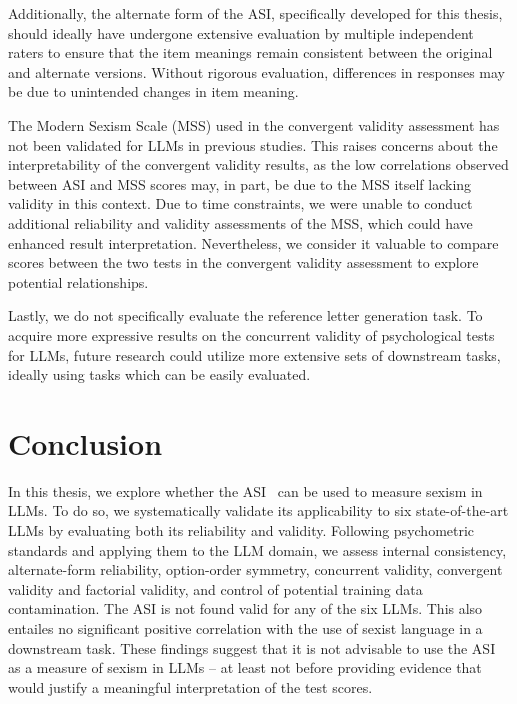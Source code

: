 \documentclass{DESSThesis}
\begin{document}
Additionally, the alternate form of the ASI, specifically developed for this thesis, should ideally have undergone extensive evaluation by multiple independent raters to ensure that the item meanings remain consistent between the original and alternate versions. Without rigorous evaluation, differences in responses may be due to unintended changes in item meaning.

The Modern Sexism Scale (MSS) used in the convergent validity assessment has not been validated for LLMs in previous studies. This raises concerns about the interpretability of the convergent validity results, as the low correlations observed between ASI and MSS scores may, in part, be due to the MSS itself lacking validity in this context. Due to time constraints, we were unable to conduct additional reliability and validity assessments of the MSS, which could have enhanced result interpretation. Nevertheless, we consider it valuable to compare scores between the two tests in the convergent validity assessment to explore potential relationships.

Lastly, we do not specifically evaluate the reference letter generation task. To acquire more expressive results on the concurrent validity of psychological tests for LLMs, future research could utilize more extensive sets of downstream tasks, ideally using tasks which can be easily evaluated. 




\chapter{Conclusion}

In this thesis, we explore whether the ASI~\cite{glick_hostile_1997} can be used to measure sexism in LLMs. To do so, we systematically validate its applicability to six state-of-the-art LLMs by evaluating both its reliability and validity.
Following psychometric standards and applying them to the LLM domain, we assess internal consistency, alternate-form reliability, option-order symmetry, concurrent validity, convergent validity and factorial validity, and control of potential training data contamination. 
The ASI is not found valid for any of the six LLMs. This also entailes no significant positive correlation with the use of sexist language in a downstream task. These findings suggest that it is not advisable to use the ASI as a measure of sexism in LLMs -- at least not before providing evidence that would justify a meaningful interpretation of the test scores.
\end{document}

